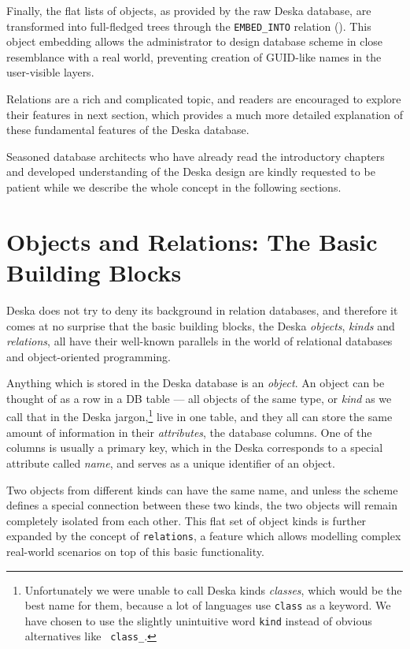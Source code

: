 \documentclass[deska]{subfiles}
\begin{document}
Finally, the flat lists of objects, as provided by the raw Deska database, are transformed into full-fledged trees
through the {\tt EMBED\_INTO} relation ().  This object embedding allows the
administrator to design database scheme in close resemblance with a real world, preventing creation of GUID-like names
in the user-visible layers.

Relations are a rich and complicated topic, and readers are encouraged to explore their features in next section,
which provides a much more detailed explanation of these fundamental features of the Deska database.

Seasoned database architects who have already read the introductory chapters and developed understanding of the Deska
design are kindly requested to be patient while we describe the whole concept in the following sections.

\section{Objects and Relations: The Basic Building Blocks}
\label{sec:objects-and-relations}

Deska does not try to deny its background in relation databases, and therefore it comes at no surprise that the basic
building blocks, the Deska {\em objects}, {\em kinds} and {\em relations}, all have their well-known parallels in the
world of relational databases and object-oriented programming.

Anything which is stored in the Deska database is an {\em object}. An object can be thought of as a row in a DB table ---
all objects of the same type, or {\em kind} as we call that in the Deska jargon,\footnote{Unfortunately we were unable
to call Deska kinds {\em classes}, which would be the best name for them, because a lot of languages use {\tt class} as
a keyword.  We have chosen to use the slightly unintuitive word {\tt kind} instead of obvious alternatives like {\tt
class\_}.} live in one table, and they all can
store the same amount of information in their {\em attributes}, the database columns.  One of the columns is usually a
primary key, which in the Deska corresponds to a special attribute called {\em name}, and serves as a unique identifier
of an object.

Two objects from different kinds can have the same name, and unless the scheme defines a special connection between
these two kinds, the two objects will remain completely isolated from each other.  This flat set of object kinds is
further expanded by the concept of {\tt relations}, a feature which allows modelling complex real-world scenarios on top
of this basic functionality.
\end{document}
